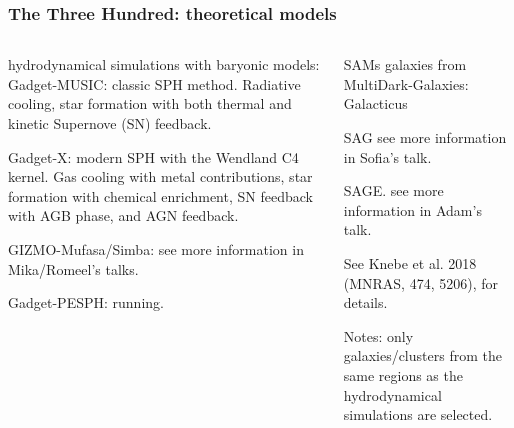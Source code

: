 \documentclass[aspectratio=43]{beamer}
\begin{document}
\begin{frame}
  \frametitle{The Three Hundred: theoretical models}
  \begin{columns}[t]
    \begin{column}{0.55\textwidth}
      \begin{block}{hydrodynamical simulations with baryonic models:}
        {\sc Gadget-\alert{MUSIC}}: classic SPH method. Radiative cooling, star formation with both thermal and kinetic Supernove (SN) feedback.

        {\sc Gadget-\alert{X}}: modern SPH with the Wendland C4 kernel. Gas cooling with metal contributions, star formation with chemical enrichment, SN feedback with AGB phase, and AGN feedback.

        {\sc GIZMO-\alert{Mufasa/Simba}:} see more information in Mika/Romeel's talks.

        {\sc Gadget-\alert{PESPH:}} running.
      \end{block}
    \end{column}
    \begin{column}{0.42\textwidth}
      \begin{block}{SAMs galaxies from MultiDark-Galaxies:}
        {\sc Galacticus}

        {\sc SAG} see more information in Sofia's talk.

        {\sc SAGE}. see more information in Adam's talk.

        See Knebe et al. 2018 (MNRAS, 474, 5206), for details.

        Notes: only galaxies/clusters from \alert{the same regions} as the hydrodynamical simulations are selected.
      \end{block}
    \end{column}
  \end{columns}
\end{frame}
\end{document}
